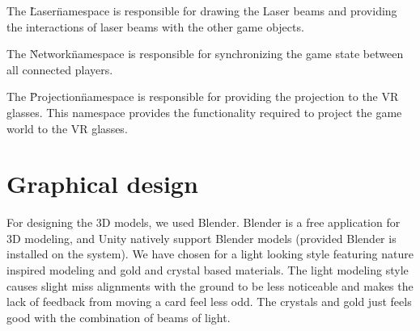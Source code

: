 		The \"Laser\" namespace is responsible for drawing the Laser beams and
		providing the interactions of laser beams with the other game objects.

		The \"Network\" namespace is responsible for synchronizing the game state
		between all connected players.

		The \"Projection\" namespace is responsible for providing the projection to
		the VR glasses. This namespace provides the functionality required to project
		the game world to the VR glasses.

	\section{Graphical design} \label{sec:graphicaldesign}
		For designing the 3D models, we used Blender. Blender is a free application
		for 3D modeling, and Unity natively support Blender models (provided Blender
		is installed on the system). We have chosen for a light looking style featuring 
		nature inspired modeling and gold and crystal based materials. The light modeling 
		style causes slight miss alignments with the ground to be less noticeable and
		makes the lack of feedback from moving a card feel less odd. The crystals and gold 
		just feels good with the combination of beams of light. 

